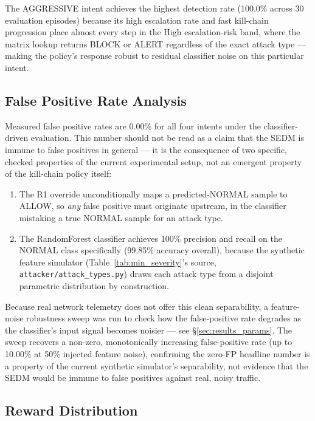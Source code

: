 The AGGRESSIVE intent achieves the highest detection rate (100.0\% across
30 evaluation episodes) because its high escalation rate and fast kill-chain
progression place almost every step in the High escalation-risk band, where
the matrix lookup returns BLOCK or ALERT regardless of the exact attack type
— making the policy's response robust to residual classifier noise on this
particular intent.

\subsection{False Positive Rate Analysis}

Measured false positive rates are 0.00\% for all four intents under the
classifier-driven evaluation. This number should not be read as a claim
that the SEDM is immune to false positives in general — it is the
consequence of two specific, checked properties of the current experimental
setup, not an emergent property of the kill-chain policy itself:

\begin{enumerate}
  \item The R1 override unconditionally maps a predicted-NORMAL sample to
        ALLOW, so \emph{any} false positive must originate upstream, in the
        classifier mistaking a true NORMAL sample for an attack type.
  \item The RandomForest classifier achieves 100\% precision and recall on
        the NORMAL class specifically (99.85\% accuracy overall), because
        the synthetic feature simulator (Table~\ref{tab:min_severity}'s
        source, \texttt{attacker/attack\_types.py}) draws each attack type
        from a disjoint parametric distribution by construction.
\end{enumerate}

Because real network telemetry does not offer this clean separability, a
feature-noise robustness sweep was run to check how the false-positive rate
degrades as the classifier's input signal becomes noisier — see
\S\ref{sec:results_params}. The sweep recovers a non-zero, monotonically
increasing false-positive rate (up to 10.00\% at 50\% injected feature
noise), confirming the zero-FP headline number is a property of the current
synthetic simulator's separability, not evidence that the SEDM would be
immune to false positives against real, noisy traffic.

\subsection{Reward Distribution}

